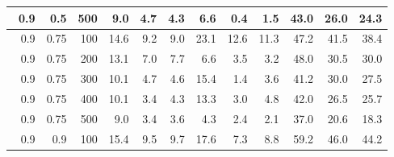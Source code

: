 \begin{longtable}{|r|r|r|r|r|r|r|r|r|r|r|r|}
    \hline \
    0.9                            & 0.5                    & 500                       & 9.0                      & 4.7                       & 4.3                       & 6.6                       & 0.4                       & 1.5                       & 43.0                      & 26.0                      & 24.3                      \\
    \hline \
    0.9                            & 0.75                    & 100                       & 14.6                      & 9.2                       & 9.0                       & 23.1                      & 12.6                       & 11.3                       & 47.2                      & 41.5                      & 38.4                      \\
    \hline \
    0.9                            & 0.75                    & 200                       & 13.1                      & 7.0                       & 7.7                       & 6.6                      & 3.5                       & 3.2                       & 48.0                      & 30.5                      & 30.0                      \\
    \hline \
    0.9                            & 0.75                    & 300                       & 10.1                       & 4.7                       & 4.6                       & 15.4                       & 1.4                       & 3.6                       & 41.2                      & 30.0                      & 27.5                      \\
    \hline \
    0.9                            & 0.75                     & 400                       & 10.1                      & 3.4                       & 4.3                       & 13.3                      & 3.0                       & 4.8                       & 42.0                      & 26.5                      & 25.7                      \\
    \hline \
    0.9                            & 0.75                     & 500                       & 9.0                      & 3.4                       & 3.6                       & 4.3                      & 2.4                       & 2.1                       & 37.0                      & 20.6                      & 18.3                      \\
    \hline \
    0.9                            & 0.9                     & 100                       & 15.4                       & 9.5                       & 9.7                       & 17.6                      & 7.3                       & 8.8                       & 59.2                      & 46.0                      & 44.2                      \\

\end{longtable}
